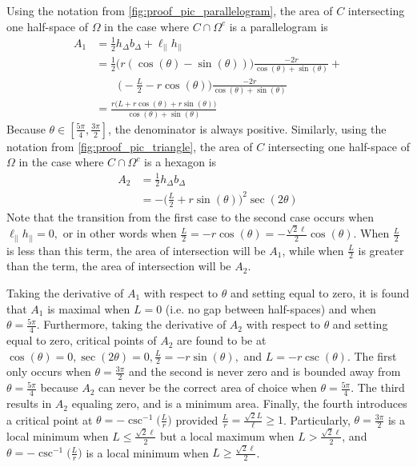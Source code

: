 Using the notation from \cref{fig:proof_pic_parallelogram}, the area of $C$ intersecting one half-space of $\Omega$ in the case where $C\cap\Omega^c$ is a parallelogram is 
\begin{align*}
	A_1 &= \frac{1}{2}h_\Delta b_\Delta + \ell_{||} h_{||}\\
		&= \frac{1}{2}\big(r (\cos(\theta) - \sin(\theta))\big)\frac{-2r}{\cos(\theta)+\sin(\theta)} + \\
		& \qquad\big(-\frac{L}{2}-r\cos(\theta)\big)\frac{-2r}{\cos(\theta)+\sin(\theta)}\\
		&= \frac{r \big(L + r \cos(\theta)  + r\sin(\theta)\big)}{\cos(\theta) + \sin(\theta)} 
\end{align*}
Because $\theta \in [\frac{5\pi}{4},\frac{3\pi}{2}]$, the denominator is always positive.
Similarly, using the notation from \cref{fig:proof_pic_triangle}, the area of $C$ intersecting one half-space of $\Omega$ in the case where $C\cap\Omega^c$ is a hexagon is
\begin{align*}
	A_2 &= \frac{1}{2}h_\Delta b_\Delta \\
	     &= -\big(\frac{L}{2} + r\sin(\theta)\big)^2\sec(2\theta)
\end{align*}
Note that the transition from the first case to the second case occurs when $\ell_{||} h_{||} = 0,$ or in other words when $\frac{L}{2} = -r \cos(\theta) = -\frac{\sqrt{2}\ell}{2} \cos(\theta).$
When $\frac{L}{2}$ is less than this term, the area of intersection will be $A_1$, while when $\frac{L}{2}$ is greater than the term, the area of intersection will be $A_2$.
 
 Taking the derivative of $A_1$ with respect to $\theta$ and setting equal to zero, it is found that $A_1$ is maximal when $L=0$ (i.e. no gap between half-spaces) and when $\theta = \frac{5\pi}{4}$.
 Furthermore, taking the derivative of $A_2$ with respect to $\theta$ and setting equal to zero, critical points of $A_2$ are found to be at $\cos(\theta) = 0, \sec(2\theta) = 0, \frac{L}{2} = -r \sin(\theta), $ and $L = -r \csc(\theta)$.
 The first only occurs when $\theta = \frac{3\pi}{2}$ and the second is never zero and is bounded away from $\theta=\frac{5\pi}{4}$ because $A_2$ can never be the correct area of choice when $\theta=\frac{5\pi}{4}$.
 The third results in $A_2$ equaling zero, and is a minimum area.
 Finally, the fourth introduces a critical point at $\theta = -\csc^{-1}\big(\frac{L}{r}\big)$ provided $\frac{L}{r} = \frac{\sqrt{2}L}{\ell} \geq 1$.
Particularly, $\theta = \frac{3\pi}{2}$ is a local minimum when $L \leq \frac{\sqrt{2}\ell}{2}$ but a local maximum when $L > \frac{\sqrt{2}\ell}{2}$, and $\theta = -\csc^{-1}\big(\frac{L}{r}\big)$ is a local minimum when $L \geq \frac{\sqrt{2}\ell}{2}$.

